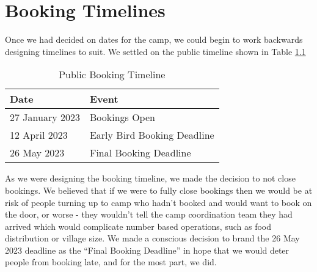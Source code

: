 \chapter{Booking Timelines}
Once we had decided on dates for the camp, we could begin to work backwards designing timelines to suit. We settled on the public timeline shown in Table \ref{tab:booking-public-timeline}

\begin{table}[h]
    \centering
    {\RaggedRight
    \begin{tabular}{p{} p{}}
    \textbf{Date} & \textbf{Event}\\
    \hline
    \hline
    27 January 2023 & Bookings Open\\
    \hline
    12 April 2023 & Early Bird Booking Deadline\\
    \hline
    26 May 2023 & Final Booking Deadline\\
    \hline
    \end{tabular}
    } %
    \caption{Public Booking Timeline}
    \label{tab:booking-public-timeline}
\end{table}

As we were designing the booking timeline, we made the decision to not close bookings. We believed that if we were to fully close bookings then we would be at risk of people turning up to camp who hadn't booked and would want to book on the door, or worse - they wouldn't tell the camp coordination team they had arrived which would complicate number based operations, such as food distribution or village size. We made a conscious decision to brand the 26 May 2023 deadline as the ``Final Booking Deadline'' in hope that we would deter people from booking late, and for the most part, we did.\\

